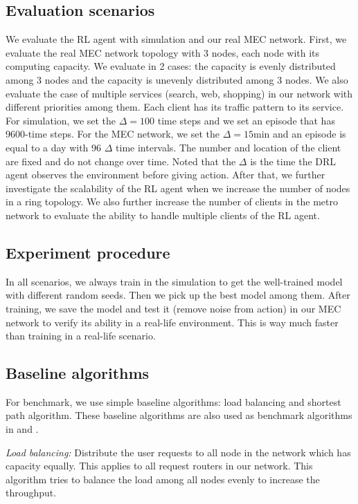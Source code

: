\documentclass[conference]{IEEEtran}
\begin{document}
\subsection{Evaluation scenarios}
We evaluate the RL agent with simulation and our real MEC network. First, we evaluate the real MEC network topology with 3 nodes, each node with its computing capacity. We evaluate in 2 cases: the capacity is evenly distributed among 3 nodes and the capacity is unevenly distributed among 3 nodes. We also evaluate the case of multiple services (search, web, shopping) in our network with different priorities among them. Each client has its traffic pattern to its service. For simulation, we set the $\Delta = 100$ time steps and we set an episode that has 9600-time steps. For the MEC network, we set the $\Delta = 15$min and an episode is equal to a day with 96 $\Delta$ time intervals. The number and location of the client are fixed and do not change over time. Noted that the $\Delta$ is the time the DRL agent observes the environment before giving action. After that, we further investigate the scalability of the RL agent when we increase the number of nodes in a ring topology. We also further increase the number of clients in the metro network to evaluate the ability to handle multiple clients of the RL agent. 

\subsection{Experiment procedure}
In all scenarios, we always train in the simulation to get the well-trained model with different random seeds. Then we pick up the best model among them. After training, we save the model and test it (remove noise from action) in our MEC network to verify its ability in a real-life environment. This is way much faster than training in a real-life scenario. 

\subsection{Baseline algorithms}
For benchmark, we use simple baseline algorithms: load balancing and shortest path algorithm. These baseline algorithms are also used as benchmark algorithms in \cite{8485853} and \cite{9269087}. 

\textit{Load balancing:} Distribute the user requests to all node in the network which has capacity equally. This applies to all request routers in our network. This algorithm tries to balance the load among all nodes evenly to increase the throughput. 
\end{document}

